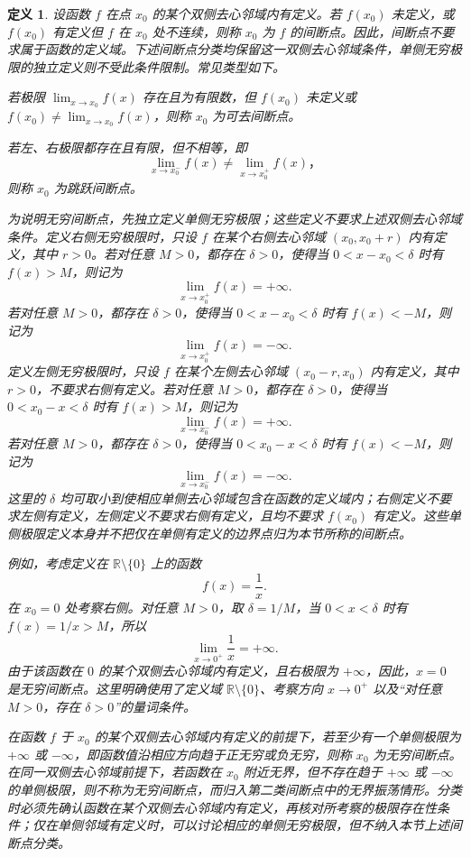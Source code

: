 \documentclass[UTF8,fontset=fandol,11pt]{ctexart}
\newtheorem{definition}{定义}[section]
\begin{document}
\begin{definition}
设函数 $f$ 在点 $x_0$ 的某个双侧去心邻域内有定义。若 $f(x_0)$ 未定义，或 $f(x_0)$ 有定义但 $f$ 在 $x_0$ 处不连续，则称 $x_0$ 为 $f$ 的间断点。因此，间断点不要求属于函数的定义域。下述间断点分类均保留这一双侧去心邻域条件，单侧无穷极限的独立定义则不受此条件限制。常见类型如下。

若极限 $\lim_{x\to x_0}f(x)$ 存在且为有限数，但 $f(x_0)$ 未定义或 $f(x_0)\neq\lim_{x\to x_0}f(x)$，则称 $x_0$ 为可去间断点。

若左、右极限都存在且有限，但不相等，即
\[
\lim_{x\to x_0^-}f(x)\neq\lim_{x\to x_0^+}f(x)\text{，}
\]
则称 $x_0$ 为跳跃间断点。

为说明无穷间断点，先独立定义单侧无穷极限；这些定义不要求上述双侧去心邻域条件。定义右侧无穷极限时，只设 $f$ 在某个右侧去心邻域 $(x_0,x_0+r)$ 内有定义，其中 $r>0$。若对任意 $M>0$，都存在 $\delta>0$，使得当 $0<x-x_0<\delta$ 时有 $f(x)>M$，则记为
\[
\lim_{x\to x_0^+}f(x)=+\infty.
\]
若对任意 $M>0$，都存在 $\delta>0$，使得当 $0<x-x_0<\delta$ 时有 $f(x)<-M$，则记为
\[
\lim_{x\to x_0^+}f(x)=-\infty.
\]
定义左侧无穷极限时，只设 $f$ 在某个左侧去心邻域 $(x_0-r,x_0)$ 内有定义，其中 $r>0$，不要求右侧有定义。若对任意 $M>0$，都存在 $\delta>0$，使得当 $0<x_0-x<\delta$ 时有 $f(x)>M$，则记为
\[
\lim_{x\to x_0^-}f(x)=+\infty.
\]
若对任意 $M>0$，都存在 $\delta>0$，使得当 $0<x_0-x<\delta$ 时有 $f(x)<-M$，则记为
\[
\lim_{x\to x_0^-}f(x)=-\infty.
\]
这里的 $\delta$ 均可取小到使相应单侧去心邻域包含在函数的定义域内；右侧定义不要求左侧有定义，左侧定义不要求右侧有定义，且均不要求 $f(x_0)$ 有定义。这些单侧极限定义本身并不把仅在单侧有定义的边界点归为本节所称的间断点。

例如，考虑定义在 $\mathbb{R}\setminus\{0\}$ 上的函数
\[
f(x)=\frac{1}{x}.
\]
在 $x_0=0$ 处考察右侧。对任意 $M>0$，取 $\delta=1/M$，当 $0<x<\delta$ 时有 $f(x)=1/x>M$，所以
\[
\lim_{x\to0^+}\frac{1}{x}=+\infty.
\]
由于该函数在 $0$ 的某个双侧去心邻域内有定义，且右极限为 $+\infty$，因此，$x=0$ 是无穷间断点。这里明确使用了定义域 $\mathbb{R}\setminus\{0\}$、考察方向 $x\to0^+$ 以及“对任意 $M>0$，存在 $\delta>0$”的量词条件。

在函数 $f$ 于 $x_0$ 的某个双侧去心邻域内有定义的前提下，若至少有一个单侧极限为 $+\infty$ 或 $-\infty$，即函数值沿相应方向趋于正无穷或负无穷，则称 $x_0$ 为无穷间断点。在同一双侧去心邻域前提下，若函数在 $x_0$ 附近无界，但不存在趋于 $+\infty$ 或 $-\infty$ 的单侧极限，则不称为无穷间断点，而归入第二类间断点中的无界振荡情形。分类时必须先确认函数在某个双侧去心邻域内有定义，再核对所考察的极限存在性条件；仅在单侧邻域有定义时，可以讨论相应的单侧无穷极限，但不纳入本节上述间断点分类。\label{def:discontinuity-types}
\end{definition}
\end{document}
